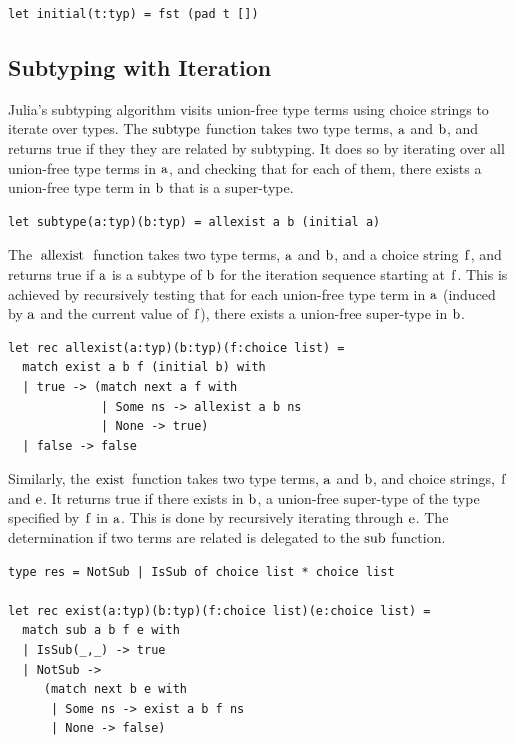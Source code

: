 \documentclass[a4paper,english]{lipics-v2019}
\renewcommand{\c}[1]{\ensuremath{\text{\lstinline{#1}}}\xspace}
\begin{document}
\begin{lstlisting}
let initial(t:typ) = fst (pad t [])
\end{lstlisting}

\subsection{Subtyping with Iteration}

Julia's subtyping algorithm visits union-free type terms using choice
strings to iterate over types.  The \c{subtype} function takes two type
terms, \c a and \c b, and returns true if they they are related by
subtyping. It does so by iterating over all union-free type terms in \c a,
and checking that for each of them, there exists a union-free type term in
\c b that is a super-type.

\begin{lstlisting}
let subtype(a:typ)(b:typ) = allexist a b (initial a)
\end{lstlisting}

\noindent
The \c{allexist} function takes two type terms, \c a and \c b, and a choice
string \c f, and returns true if \c a is a subtype of \c b for the iteration
sequence starting at \c f. This is achieved by recursively testing that for
each union-free type term in \c a (induced by \c a and the current value of
\c f), there exists a union-free super-type in \c b.

\newpage
\begin{lstlisting}
let rec allexist(a:typ)(b:typ)(f:choice list) =
  match exist a b f (initial b) with 
  | true -> (match next a f with
             | Some ns -> allexist a b ns 
             | None -> true) 
  | false -> false
\end{lstlisting}

\noindent
Similarly, the \c{exist} function takes two type terms, \c a and \c b, and
choice strings, \c f and \c e. It returns true if there exists in \c b, a
union-free super-type of the type specified by \c f in \c a. This is done by
recursively iterating through \c e. The determination if two terms are
related is delegated to the \c{sub} function.

\begin{lstlisting}
type res = NotSub | IsSub of choice list * choice list

let rec exist(a:typ)(b:typ)(f:choice list)(e:choice list) =
  match sub a b f e with 
  | IsSub(_,_) -> true 
  | NotSub -> 
     (match next b e with
      | Some ns -> exist a b f ns 
      | None -> false) 
\end{lstlisting}
\end{document}
